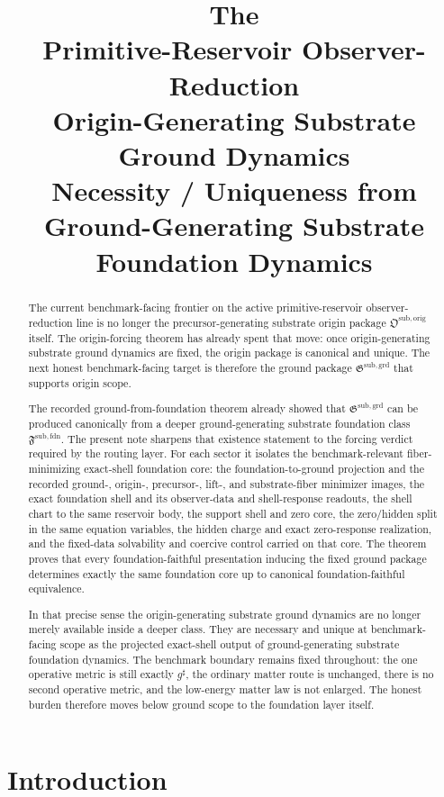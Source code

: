 \documentclass[11pt]{article}
\title{\textbf{The \TheoryName{}}\\[0.4em]
\large Primitive-Reservoir Observer-Reduction\\
\large Origin-Generating Substrate Ground Dynamics\\
\large Necessity / Uniqueness from\\
\large Ground-Generating Substrate Foundation Dynamics}
\author{}
\date{}
\newcommand{\CompletedMetric}{g^{\sharp}}
\newcommand{\OriginPackage}{\mathfrak O^{\mathrm{sub,orig}}}
\newcommand{\GroundPackage}{\mathfrak G^{\mathrm{sub,grd}}}
\newcommand{\FoundationPackage}{\mathfrak F^{\mathrm{sub,fdn}}}
\begin{document}
\maketitle

\begin{abstract}
The current benchmark-facing frontier on the active primitive-reservoir observer-reduction line is no longer the precursor-generating substrate origin package \(\OriginPackage\) itself. The origin-forcing theorem has already spent that move: once origin-generating substrate ground dynamics are fixed, the origin package is canonical and unique. The next honest benchmark-facing target is therefore the ground package \(\GroundPackage\) that supports origin scope.

The recorded ground-from-foundation theorem already showed that \(\GroundPackage\) can be produced canonically from a deeper ground-generating substrate foundation class \(\FoundationPackage\). The present note sharpens that existence statement to the forcing verdict required by the routing layer. For each sector it isolates the benchmark-relevant fiber-minimizing exact-shell foundation core: the foundation-to-ground projection and the recorded ground-, origin-, precursor-, lift-, and substrate-fiber minimizer images, the exact foundation shell and its observer-data and shell-response readouts, the shell chart to the same reservoir body, the support shell and zero core, the zero/hidden split in the same equation variables, the hidden charge and exact zero-response realization, and the fixed-data solvability and coercive control carried on that core. The theorem proves that every foundation-faithful presentation inducing the fixed ground package determines exactly the same foundation core up to canonical foundation-faithful equivalence.

In that precise sense the origin-generating substrate ground dynamics are no longer merely available inside a deeper class. They are necessary and unique at benchmark-facing scope as the projected exact-shell output of ground-generating substrate foundation dynamics. The benchmark boundary remains fixed throughout: the one operative metric is still exactly \(\CompletedMetric\), the ordinary matter route is unchanged, there is no second operative metric, and the low-energy matter law is not enlarged. The honest burden therefore moves below ground scope to the foundation layer itself.
\end{abstract}

\section{Introduction}
\end{document}
